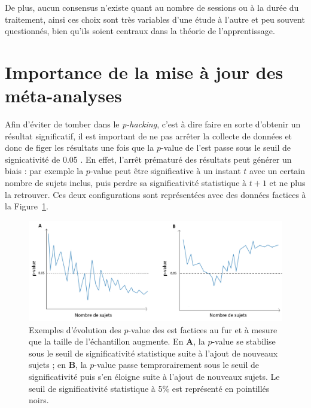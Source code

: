 De plus, aucun consensus n'existe quant au nombre de sessions ou à la durée du traitement, ainsi ces choix sont très variables d'une étude à l'autre et peu
souvent questionnés, bien qu'ils soient centraux dans la théorie de l'apprentissage.


\section{Importance de la mise à jour des méta-analyses} \label{need_to_update_meta_analysis}

Afin d'éviter de tomber dans le \textit{p-hacking}, c'est à dire faire en sorte d'obtenir un résultat significatif, il est important de ne pas arrêter la collecte de données 
et donc de figer les résultats une fois que la $p$-value de l'\gls{est} passe sous le seuil de signicativité de 0.05 \citep{Head2015, Coffman2015}. En effet, l'arrêt prématuré des résultats peut
générer un biais : par exemple la $p$-value peut être significative à un instant $t$ avec un certain nombre de sujets inclus, puis perdre sa significativité statistique à
$t + 1$ et ne plus la retrouver. Ces deux configurations sont représentées avec des données factices à la Figure~\ref{Figure:meta-analysis-evolution-p-value-examples}.

\begin{figure}[h!]
  \centering
	\includegraphics[width=1\linewidth]{figures/chapter-2/meta-analysis-evolution-p-value-examples} 
  \caption{Exemples d'évolution des $p$-value des \gls{est} factices au fur et à mesure que la taille de l'échantillon augmente. 
	En \textbf{A}, la $p$-value se stabilise sous le seuil de significativité statistique suite à l'ajout de nouveaux sujets ; en \textbf{B}, la $p$-value 
	passe temprorairement sous le seuil de significativité puis s'en éloigne suite à l'ajout de nouveaux sujets. 
	Le seuil de significativité statistique à 5\% est représenté en pointillés noirs.}
  \label{Figure:meta-analysis-evolution-p-value-examples}
\end{figure}

